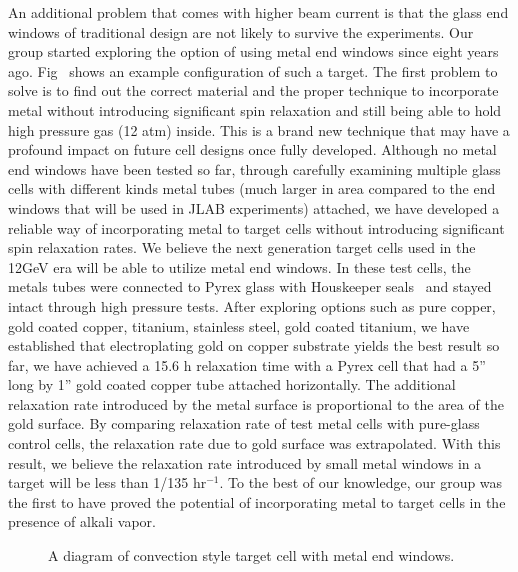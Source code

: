 An additional problem that comes with higher beam current is that the glass end windows of traditional design are not likely to survive the experiments. Our group started exploring the option of using metal end windows since eight years ago. Fig~\cite{metal_end_windows} shows an example configuration of such a target. The first problem to solve is to find out the correct material and the proper technique to incorporate metal without introducing significant spin relaxation and still being able to hold high pressure gas (12 atm) inside. This is a brand new technique that may have a profound impact on future cell designs once fully developed. Although no metal end windows have been tested so far, through carefully examining multiple glass cells with different kinds metal tubes (much larger in area compared to the end windows that will be used in JLAB experiments) attached, we have developed a reliable way of incorporating metal to target cells without introducing significant spin relaxation rates. We believe the next generation target cells used in the 12GeV era will be able to utilize metal end windows. In these test cells, the metals tubes were connected to Pyrex glass with Houskeeper seals~\cite{Houskeeper} and stayed intact through high pressure tests. After exploring options such as pure copper, gold coated copper, titanium, stainless steel, gold coated titanium, we have established that electroplating gold on copper substrate yields the best result so far, we have achieved a 15.6 h relaxation time with a Pyrex cell that had a 5'' long by 1'' gold coated copper tube attached horizontally. The additional relaxation rate introduced by the metal surface is proportional to the area of the gold surface. By comparing relaxation rate of test metal cells with pure-glass control cells, the relaxation rate due to gold surface was extrapolated. With this result, we believe the relaxation rate introduced by small metal windows in a target will be less than 1/135 hr$^{-1}$. To the best of our knowledge, our group was the first to have proved the potential of incorporating metal to target cells in the presence of alkali vapor. 

\begin{figure}[t!]
	\centering
	\caption{{A diagram of convection style target cell with metal end windows. }}
	\label{metal_end_windows}
\end{figure}

